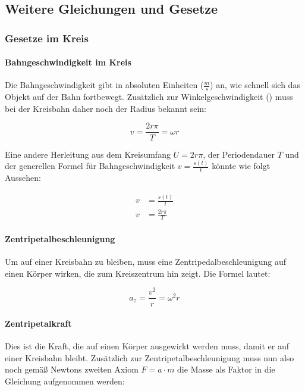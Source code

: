 \subsection{Weitere Gleichungen und Gesetze}

\subsubsection{Gesetze im Kreis}

\paragraph{Bahngeschwindigkeit im Kreis}

Die Bahngeschwindigkeit gibt in absoluten Einheiten ($\frac{m}{s}$) an, wie schnell sich das Objekt auf der Bahn fortbewegt. Zusätzlich zur Winkelgeschwindigkeit () muss bei der Kreisbahn daher noch der Radius bekannt sein:

\begin{equation*} \label{eq:bahngeschwindigkeit}
	v=\frac{2r\pi}{T}=\omega r
\end{equation*}

Eine andere Herleitung aus dem Kreisumfang $U=2r\pi$, der Periodendauer $T$ und der generellen Formel für Bahngeschwindigkeit $v=\frac{s(t)}{t}$ könnte wie folgt Aussehen:

\begin{align*}
	v&=\frac{s(t)}{t} \\
	v&=\frac{2r\pi}{T}
\end{align*}


\paragraph{Zentripetalbeschleunigung}

Um auf einer Kreisbahn zu bleiben, muss eine Zentripedalbeschleunigung auf einen Körper wirken, die zum Kreiszentrum hin zeigt. Die Formel lautet:

\begin{equation*}
	a_z=\frac{v^2}{r}=\omega^2 r
\end{equation*}


\paragraph{Zentripetalkraft}

Dies ist die Kraft, die auf einen Körper ausgewirkt werden muss, damit er auf einer Kreisbahn bleibt. Zusätzlich zur Zentripetalbeschleunigung muss nun also noch gemäß Newtons zweiten Axiom $F=a \cdot m$ die Masse als Faktor in die Gleichung aufgenommen werden:

